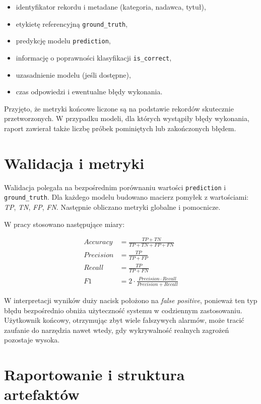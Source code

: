 \documentclass[12pt,a4paper,openany]{report}
\begin{document}
\begin{itemize}
    \item identyfikator rekordu i metadane (kategoria, nadawca, tytuł),
    \item etykietę referencyjną \texttt{ground\_truth},
    \item predykcję modelu \texttt{prediction},
    \item informację o poprawności klasyfikacji \texttt{is\_correct},
    \item uzasadnienie modelu (jeśli dostępne),
    \item czas odpowiedzi i ewentualne błędy wykonania.
\end{itemize}

Przyjęto, że metryki końcowe liczone są na podstawie rekordów skutecznie przetworzonych. W przypadku modeli, dla których wystąpiły błędy wykonania, raport zawierał także liczbę próbek pominiętych lub zakończonych błędem.

\section{Walidacja i metryki}

Walidacja polegała na bezpośrednim porównaniu wartości \texttt{prediction} i \texttt{ground\_truth}. Dla każdego modelu budowano macierz pomyłek z wartościami: \textit{TP}, \textit{TN}, \textit{FP}, \textit{FN}. Następnie obliczano metryki globalne i pomocnicze.

W pracy stosowano następujące miary:

\begin{align*}
Accuracy &= \frac{TP + TN}{TP + TN + FP + FN} \\
Precision &= \frac{TP}{TP + FP} \\
Recall &= \frac{TP}{TP + FN} \\
F1 &= 2 \cdot \frac{Precision \cdot Recall}{Precision + Recall}
\end{align*}

W interpretacji wyników duży nacisk położono na \textit{false positive}, ponieważ ten typ błędu bezpośrednio obniża użyteczność systemu w codziennym zastosowaniu. Użytkownik końcowy, otrzymując zbyt wiele fałszywych alarmów, może tracić zaufanie do narzędzia nawet wtedy, gdy wykrywalność realnych zagrożeń pozostaje wysoka.

\section{Raportowanie i struktura artefaktów}
\end{document}
